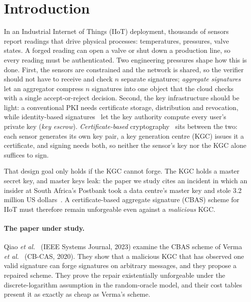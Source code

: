 \section{Introduction}\label{sec:intro}

In an Industrial Internet of Things (IIoT) deployment, thousands of sensors report readings that drive
physical processes: temperatures, pressures, valve states. A forged reading can open a valve or shut
down a production line, so every reading must be authenticated. Two engineering pressures shape how
this is done. First, the sensors are constrained and the network is shared, so the verifier should not
have to receive and check $n$ separate signatures; \emph{aggregate signatures}~\cite{boneh2003} let an
aggregator compress $n$ signatures into one object that the cloud checks with a single accept-or-reject
decision. Second, the key infrastructure should be light: a conventional PKI needs certificate storage,
distribution and revocation, while identity-based signatures~\cite{shamir1984} let the key authority
compute every user's private key (\emph{key escrow}). \emph{Certificate-based} cryptography~\cite{gentry2003}
sits between the two: each sensor generates its own key pair, a key generation centre (KGC) issues it a
certificate, and signing needs both, so neither the sensor's key nor the KGC alone suffices to sign.

That design goal only holds if the KGC cannot forge. The KGC holds a master secret key, and master keys
leak: the paper we study cites an incident in which an insider at South Africa's Postbank took a data
centre's master key and stole 3.2 million US dollars~\cite{qiao2023}. A certificate-based aggregate
signature (CBAS) scheme for IIoT must therefore remain unforgeable even against a \emph{malicious} KGC.

\paragraph{The paper under study.}
Qiao \emph{et al.}~\cite{qiao2023} (IEEE Systems Journal, 2023) examine the CBAS scheme of Verma
\emph{et al.}~\cite{verma2020} (CB-CAS, 2020). They show that a malicious KGC that has observed one valid
signature can forge signatures on arbitrary messages, and they propose a repaired scheme. They prove the
repair existentially unforgeable under the discrete-logarithm assumption in the random-oracle model, and
their cost tables present it as exactly as cheap as Verma's scheme.

